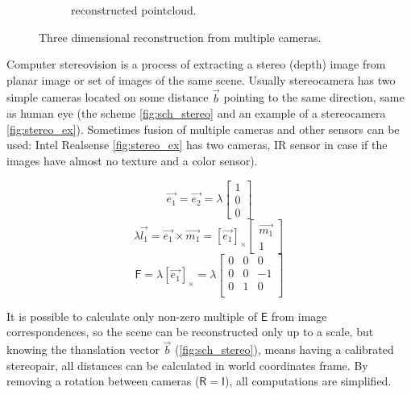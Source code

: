 \begin{figure}[h]
\begin{subfigure}[b]{0.65\textwidth}
      \caption{reconstructed pointcloud.}
      \label{fig:pc_output}
    \end{subfigure}
    \caption{Three dimensional reconstruction from multiple cameras.}
    \label{fig:pc_recons}
\end{figure}

Computer stereovision is a process of extracting a stereo (depth) image from planar image or set of images of the same scene. Usually stereocamera has two simple cameras located on some distance $\vec{b}$ pointing to the same direction, same as human eye (the scheme \autoref{fig:sch_stereo} and an example of a stereocamera \autoref{fig:stereo_ex}). 
Sometimes fusion of multiple cameras and other sensors can be used:
Intel Realsense \autoref{fig:stereo_ex} has two cameras, IR sensor in case if the images have almost no texture and a color sensor). 

\begin{equation}
    \label{eq:e1e2}
    \vec{e_1} = \vec{e_2} = \lambda \begin{bmatrix} 1 \\ 0 \\ 0 \end{bmatrix}
\end{equation}
\begin{equation}
    \label{eq:e1m1}
    \lambda \vec{l_1} = \vec{e_1} \times \vec{m_1} = [\vec{e_1}]_\times \begin{bmatrix} \vec{m_1} \\ 1\end{bmatrix}
\end{equation}
\begin{equation}
    \label{eq:F_simple}
    \pmb{\mathsf{F}} = \lambda [\vec{e_1}]_\times = \lambda \begin{bmatrix}
        0 & 0 & 0 \\
        0 & 0 & -1 \\
        0 & 1 & 0 \\
    \end{bmatrix}
\end{equation}

It is possible to calculate only non-zero multiple of $\pmb{\mathsf{E}}$ from image correspondences, so the scene can be reconstructed only up to a scale, but knowing the thanslation vector $\vec{b}$ (\autoref{fig:sch_stereo}), means having a calibrated stereopair, all distances can be calculated in world coordinates frame.
By removing a rotation between cameras ($\pmb{\mathsf{R}} = \pmb{\mathsf{I}}$), all computations are simplified.

